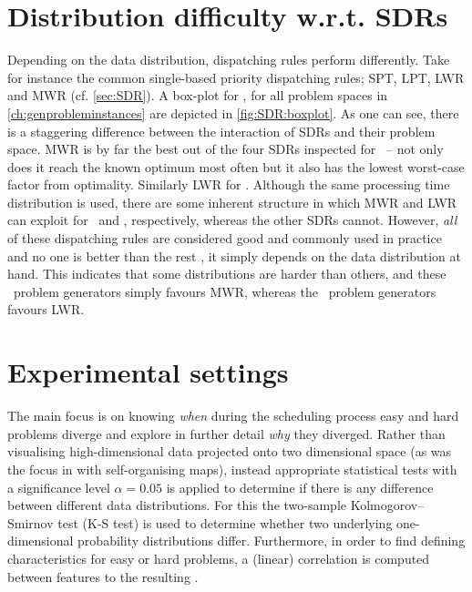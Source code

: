 \section{Distribution difficulty w.r.t. SDRs}
Depending on the data distribution, dispatching rules perform differently. Take for instance the common single-based priority dispatching rules; SPT, LPT, LWR and MWR (cf. \cref{sec:SDR}). 
A box-plot for \fullnamerho, for all problem spaces in \cref{ch:genprobleminstances} are depicted in \cref{fig:SDR:boxplot}. 
As one can see, there is a staggering difference between the interaction of SDRs and their problem space. MWR is by far the best out of the four SDRs inspected for \JSP\ -- not only does it reach the known optimum most often but it also has the lowest worst-case factor from optimality. Similarly LWR for \FSP.
Although the same processing time distribution is used, there are some inherent structure in which MWR and LWR can exploit for \JSP\ and  \FSP, respectively, whereas the other SDRs cannot. However, \emph{all} of these dispatching rules are considered good and commonly used in practice and no one is better than the rest \citep{Haupt89}, it simply depends on the data distribution at hand. This indicates that some distributions are harder than others, and these \JSP\ problem generators simply favours MWR, whereas the \FSP\ problem generators favours LWR. 

\section{Experimental settings}

The main focus is on knowing \emph{when} during the scheduling process easy and hard problems diverge and explore in further detail \emph{why} they diverged. Rather than visualising high-dimensional data projected onto two dimensional space (as was the focus in \cite{SmithMilesLion5} with self-organising maps), instead appropriate statistical tests with a significance level $\alpha=0.05$ is applied to determine if there is any difference between different data distributions. For this the two-sample Kolmogorov–Smirnov test (K-S test) is used to determine whether two underlying one-dimensional probability distributions differ. 
Furthermore, in order to find defining characteristics for easy or hard problems, a (linear) correlation is computed between features to the resulting \namerho.

